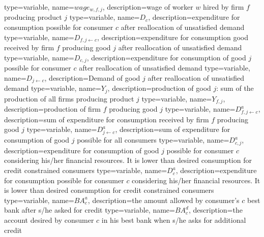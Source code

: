 
{%
  type=variable,%
  name={$wage_{w,f,j}$},%
  description={wage of worker $w$ hired by firm $f$ producing product $j$} 
}
{%
  type=variable,%
  name={$D_{c}$},%
  description={expenditure for consumption possible for consumer $c$ after reallocation of unsatisfied demand} 
}
{%
  type=variable,%
  name={$D_{f,j\leftarrow c}$},%
  description={expenditure for consumption good received by firm $f$ producing good $j$ after reallocation of unsatisfied demand} 
}
{%
  type=variable,%
  name={$D_{c,j}$},%
  description={expenditure for consumption of good $j$ possible for consumer $c$ after reallocation of unsatisfied demand} 
}
{%
  type=variable,%
  name={$D_{j\leftarrow c}$},%
  description={Demand of good $j$ after reallocation of unsatisfied demand} 
}
{%
  type=variable,%
  name={$Y_{j}$},%
  description={production of good $j$: sum of the production of all firms producing product $j$} 
}
{%
  type=variable,%
  name={$Y_{f,j}$},%
  description={production of firm $f$ producing good $j$} 
}
{%
  type=variable,%
  name={$D^a_{f,j\leftarrow c}$},%
  description={sum of expenditure for consumption received by firm $f$ producing good $j$} 
}
{%
  type=variable,%
  name={$D^a_{j\leftarrow c}$},%
  description={sum of expenditure for consumption of good $j$ possible for all consumers} 
}
{%
  type=variable,%
  name={$D^a_{c,j}$},%
  description={expenditure for consumption of good $j$ possible for consumer $c$ considering his/her financial resources. It is lower than desired consumption for credit constrained consumers} 
}
{%
  type=variable,%
  name={$D^a_{c}$},%
  description={expenditure for consumption possible for consumer $c$ considering his/her financial resources. It is lower than desired consumption for credit constrained consumers} 
}
{%
  type=variable,%
  name={$BA^a_{c}$},%
  description={the amount allowed by consumer's $c$ best bank after s/he asked for credit} 
}
{%
  type=variable,%
  name={$BA^d_{c}$},%
  description={the account desired by consumer $c$ in his best bank when s/he asks for additional credit} 
}
